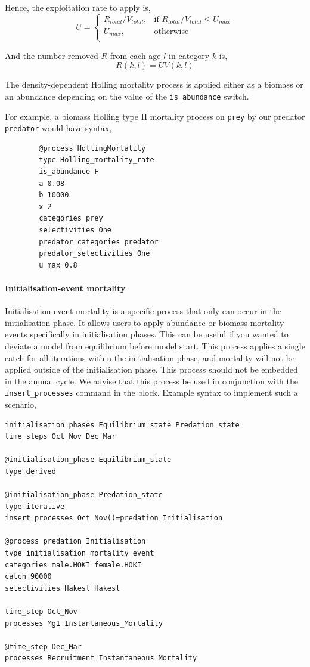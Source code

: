 Hence, the exploitation rate to apply is,
\begin{equation}
	U = \begin{cases}
		R_{total}/V_{total}, & \text{if $R_{total}/V_{total} \leq U_{max}$} \\
		U_{max}, & \text{otherwise}\\ 
	\end{cases} 
\end{equation}

And the number removed $R$ from each age $l$ in category $k$ is,
\begin{equation}
	R(k,l) = UV(k,l)
\end{equation}

The density-dependent Holling mortality process is applied either as a biomass or an abundance depending on the value of the \texttt{is\_abundance} switch.

For example, a biomass Holling type II mortality process on \texttt{prey} by our predator \texttt{predator} would have syntax,

{\small{\begin{verbatim}
		@process HollingMortality
		type Holling_mortality_rate
		is_abundance F
		a 0.08
		b 10000
		x 2
		categories prey
		selectivities One
		predator_categories predator
		predator_selectivities One
		u_max 0.8
		\end{verbatim}}}

\paragraph{Initialisation-event mortality}

Initialisation event mortality is a specific process that only can occur in the initialisation phase. It allows users to apply abundance or biomass mortality events specifically in initialisation phases. This can be useful if you wanted to deviate a model from equilibrium before model start. This process applies a single catch for all iterations within the initialisation phase, and mortality will not be applied outside of the initialisation phase. This process should not be embedded in the annual cycle. We advise that this process be used in conjunction with the \texttt{insert\_processes} command in the  block. Example syntax to implement such a scenario,

{\small{\begin{verbatim}
initialisation_phases Equilibrium_state Predation_state
time_steps Oct_Nov Dec_Mar

@initialisation_phase Equilibrium_state 
type derived

@initialisation_phase Predation_state
type iterative
insert_processes Oct_Nov()=predation_Initialisation

@process predation_Initialisation
type initialisation_mortality_event
categories male.HOKI female.HOKI
catch 90000
selectivities Hakesl Hakesl

time_step Oct_Nov
processes Mg1 Instantaneous_Mortality

@time_step Dec_Mar 
processes Recruitment Instantaneous_Mortality
\end{verbatim}}}

